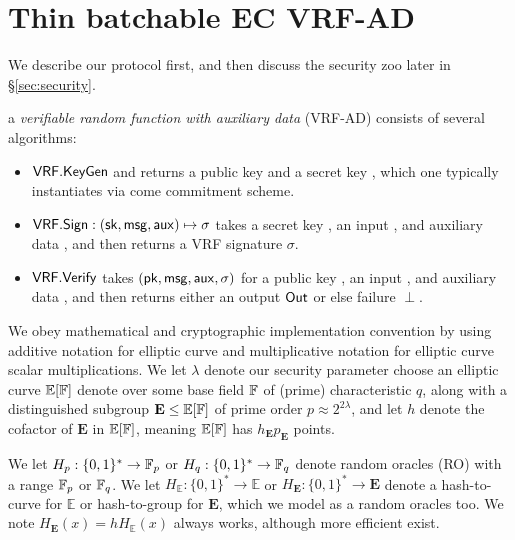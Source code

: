 
\section{Thin batchable EC VRF-AD}
\label{sec:thin_vrf}

\def\secparam{\ensuremath{\lambda}\xspace}

\def\ecE{{\mathbb{E}}}
\def\grE{{\mathbf{E}}}
\def\genE{E}
\def\genG{G}
\def\genB{K} %

\def\ecJ{{\mathbb{J}}}
\def\grJ{{\mathbf{J}}}
\def\genJ{J}

\newcommand{\ThinVRF}{\primalgo{ThinVRF}} 

We describe our protocol first, and then discuss the security zoo later in \S\ref{sec:security}.

\begin{definition}
a {\em verifiable random function with auxiliary data} (VRF-AD) consists of several algorithms:
\begin{itemize}
\item ${\mathsf{VRF}}.{\mathsf{KeyGen}}$ and returns a public key \pk and a secret key \sk, which one typically instantiates via come commitment scheme. 
\item ${\mathsf{VRF}}.{\mathsf{Sign}} : (\mathsf{sk},\mathsf{msg},\mathsf{aux}) \mapsto \sigma$ takes a secret key \sk, an input \msg, and auxiliary data \aux, and then returns a VRF signature $\sigma$.
\item ${\mathsf{VRF}}.{\mathsf{Verify}}$ takes $(\mathsf{pk},\mathsf{msg},\mathsf{aux},\sigma)$ for a public key \pk, an input \msg, and auxiliary data \aux, and then returns either an output ${\mathsf{Out}}$ or else failure $\perp$.
\end{itemize}
\end{definition}


We obey mathematical and cryptographic implementation convention by using additive notation for elliptic curve and multiplicative notation for elliptic curve scalar multiplications.  We let \secparam denote our security parameter choose an elliptic curve $\ecE[\F]$ denote over some base field $\mathbb{F}$ of (prime) characteristic $q$, along with a distinguished subgroup $\grE \le \ecE[\F]$ of prime order $p \approx 2^{2\secparam}$, and let $h$ denote the cofactor of $\grE$ in $\ecE[\F]$, meaning $\ecE[\F]$ has $h_{\grE} p_{\grE}$ points.

We let $H_p : \{0,1\}^* \to \mathbb{F}_p$ or $H_q : \{0,1\}^* \to \mathbb{F}_q$ denote random oracles (RO) with a range $\mathbb{F}_p$ or $\mathbb{F}_q$.  We let $H_\ecE : \{0,1\}^* \to \ecE$ or $H_\grE : \{0,1\}^* \to \grE$ denote a hash-to-curve for $\ecE$ or hash-to-group for $\grE$, which we model as a random oracles too.  We note $H_\grE(x) = h H_\ecE(x)$ always works, although more efficient exist.

